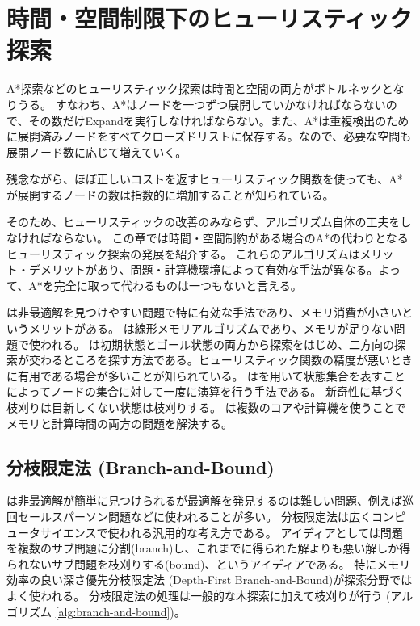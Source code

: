 \chapter{時間・空間制限下のヒューリスティック探索}
\label{ch:heuristic-search-variants}


A*探索などのヒューリスティック探索は時間と空間の両方がボトルネックとなりうる。
すなわち、A*はノードを一つずつ展開していかなければならないので、その数だけExpandを実行しなければならない。また、A*は重複検出のために展開済みノードをすべてクローズドリストに保存する。なので、必要な空間も展開ノード数に応じて増えていく。

残念ながら、ほぼ正しいコストを返すヒューリスティック関数を使っても、A*が展開するノードの数は指数的に増加することが知られている\cite{helmert:08}。

そのため、ヒューリスティックの改善のみならず、アルゴリズム自体の工夫をしなければならない。
この章では時間・空間制約がある場合のA*の代わりとなるヒューリスティック探索の発展を紹介する。
これらのアルゴリズムはメリット・デメリットがあり、問題・計算機環境によって有効な手法が異なる。よって、A*を完全に取って代わるものは一つもないと言える。

は非最適解を見つけやすい問題で特に有効な手法であり、メモリ消費が小さいというメリットがある。
は線形メモリアルゴリズムであり、メモリが足りない問題で使われる。
は初期状態とゴール状態の両方から探索をはじめ、二方向の探索が交わるところを探す方法である。ヒューリスティック関数の精度が悪いときに有用である場合が多いことが知られている。
はを用いて状態集合を表すことによってノードの集合に対して一度に演算を行う手法である。
新奇性に基づく枝刈りは目新しくない状態は枝刈りする。
は複数のコアや計算機を使うことでメモリと計算時間の両方の問題を解決する。


\section{分枝限定法 (Branch-and-Bound)}
\label{sec:branch-and-bound}

は非最適解が簡単に見つけられるが最適解を発見するのは難しい問題、例えば巡回セールスパーソン問題などに使われることが多い。
分枝限定法は広くコンピュータサイエンスで使われる汎用的な考え方である。
アイディアとしては問題を複数のサブ問題に分割(branch)し、これまでに得られた解よりも悪い解しか得られないサブ問題を枝刈りする(bound)、というアイディアである。
特にメモリ効率の良い深さ優先分枝限定法 (Depth-First Branch-and-Bound)が探索分野ではよく使われる。
分枝限定法の処理は一般的な木探索に加えて枝刈りが行う (アルゴリズム \ref{alg:branch-and-bound})。

